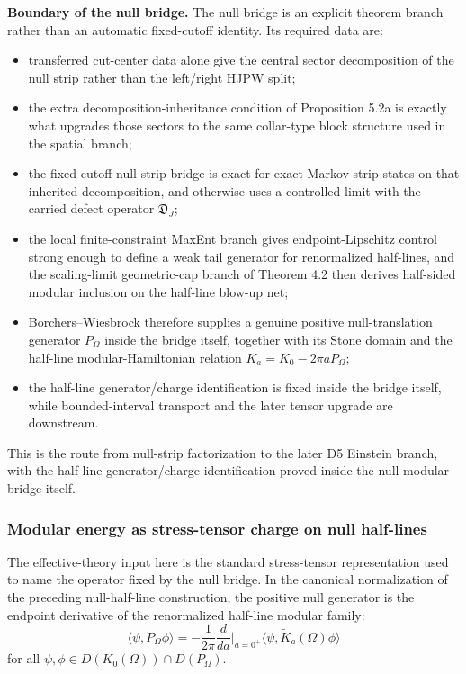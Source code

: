 \textbf{Boundary of the null bridge.} The null bridge is an explicit theorem branch rather than an automatic fixed-cutoff identity. Its required data are:
\begin{itemize}
\tightlist
\item
  transferred cut-center data alone give the central sector decomposition of the null strip rather than the left/right HJPW split;
\item
  the extra decomposition-inheritance condition of Proposition 5.2a is exactly what upgrades those sectors to the same collar-type block structure used in the spatial branch;
\item
  the fixed-cutoff null-strip bridge is exact for exact Markov strip states on that inherited decomposition, and otherwise uses a controlled limit with the carried defect operator \(\mathfrak D_J\);
\item
  the local finite-constraint MaxEnt branch gives endpoint-Lipschitz control strong enough to define a weak tail generator for renormalized half-lines, and the scaling-limit geometric-cap branch of Theorem 4.2 then derives half-sided modular inclusion on the half-line blow-up net;
\item
  Borchers--Wiesbrock therefore supplies a genuine positive null-translation generator \(P_\Omega\) inside the bridge itself, together with its Stone domain and the half-line modular-Hamiltonian relation \(K_a=K_0-2\pi aP_\Omega\);
\item
  the half-line generator/charge identification is fixed inside the bridge itself, while bounded-interval transport and the later tensor upgrade are downstream.
\end{itemize}
This is the route from null-strip factorization to the later D5 Einstein branch, with the half-line generator/charge identification proved inside the null modular bridge itself.
\subsubsection{Modular energy as stress-tensor charge on null half-lines}\label{53-modular-energy-as-stress-tensor-charge-uv-cft}

The effective-theory input here is the standard stress-tensor representation used to name the operator fixed by the null bridge. In the canonical normalization of the preceding null-half-line construction, the positive null generator is the endpoint derivative of the renormalized half-line modular family:
\[
\langle\psi,P_\Omega\phi\rangle
=
-\frac{1}{2\pi}\frac{d}{da}\Big|_{a=0^+}
\langle\psi,\widetilde K_a(\Omega)\phi\rangle
\]
for all \(\psi,\phi\in D(K_0(\Omega))\cap D(P_\Omega)\).

